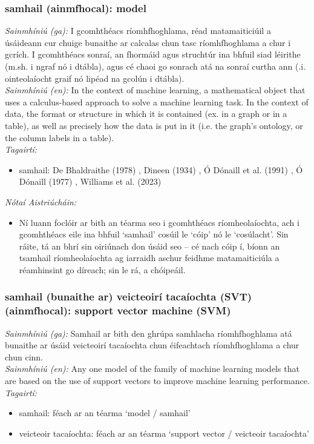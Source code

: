 \subsubsection*{samhail (ainmfhocal): model}
 \noindent \textit{Sainmhíniú (ga):} I gcomhthéacs ríomhfhoghlama, réad matamaiticiúil a úsáideann cur chuige bunaithe ar calcalas chun tasc ríomhfhoghlama a chur i gcrích. I gcomhthéacs sonraí, an fhormáid agus struchtúr ina bhfuil siad léirithe (m.sh. i ngraf nó i dtábla), agus cé chaoi go sonrach atá na sonraí curtha ann (.i. ointeolaíocht graif nó lipéad na gcolún i dtábla).
\\
 \noindent \textit{Sainmhíniú (en):} In the context of machine learning, a mathematical object that uses a calculus-based approach to solve a machine learning task. In the context of data, the format or structure in which it is contained (ex. in a graph or in a table), as well as precisely how the data is put in it (i.e. the graph's ontology, or the column labels in a table).
\\
 \noindent \textit{Tagairtí:}
\begin{itemize}
	\item samhail: De Bhaldraithe (1978) \cite{de-bhaldraithe}, Dineen (1934) \cite{dineen}, Ó Dónaill et al. (1991) \cite{focloir-beag}, Ó Dónaill (1977) \cite{odonaill}, Williams et al. (2023) \cite{storchiste}
\end{itemize}

 \noindent \textit{Nótaí Aistriúcháin:}
\begin{itemize}
	\item Ní luann foclóir ar bith an téarma seo i gcomhthéacs ríomheolaíochta, ach i gcomhthéacs eile ina bhfuil `samhail' cosúil le `cóip' nó le `cosúlacht'. Sin ráite, tá an bhrí sin oiriúnach don úsáid seo -- cé nach cóip í, bíonn an tsamhail ríomheolaíochta ag iarraidh aschur feidhme matamaiticiúla a réamhinsint go díreach; sin le rá, a chóipeáil.
\end{itemize}


\subsubsection*{samhail (bunaithe ar) veicteoirí tacaíochta (SVT) (ainmfhocal): support vector machine (SVM)}
 \noindent \textit{Sainmhíniú (ga):} Samhail ar bith den ghrúpa samhlacha ríomhfhoghlama atá bunaithe ar úsáid veicteoirí tacaíochta chun éifeachtach ríomhfhoghlama a chur chun cinn.
\\
 \noindent \textit{Sainmhíniú (en):} Any one model of the family of machine learning models that are based on the use of support vectors to improve machine learning performance.
\\
 \noindent \textit{Tagairtí:}
\begin{itemize}
	\item samhail: féach ar an téarma `model / samhail'
	\item veicteoir tacaíochta: féach ar an téarma `support vector / veicteoir tacaíochta'
\end{itemize}

